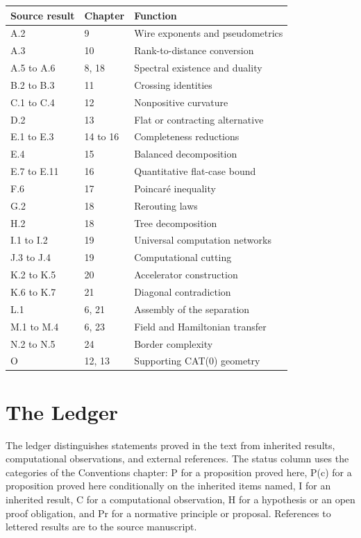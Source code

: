 \documentclass[11pt,letterpaper]{report}
\theoremstyle{plain}
\theoremstyle{definition}
\theoremstyle{remark}
\begin{document}
\begin{longtable}{p{}p{}p{}}
\hline
Source result & Chapter & Function\\
\hline
\endhead
A.2 & 9 & Wire exponents and pseudometrics\\
A.3 & 10 & Rank-to-distance conversion\\
A.5 to A.6 & 8, 18 & Spectral existence and duality\\
B.2 to B.3 & 11 & Crossing identities\\
C.1 to C.4 & 12 & Nonpositive curvature\\
D.2 & 13 & Flat or contracting alternative\\
E.1 to E.3 & 14 to 16 & Completeness reductions\\
E.4 & 15 & Balanced decomposition\\
E.7 to E.11 & 16 & Quantitative flat-case bound\\
F.6 & 17 & Poincar\'e inequality\\
G.2 & 18 & Rerouting laws\\
H.2 & 18 & Tree decomposition\\
I.1 to I.2 & 19 & Universal computation networks\\
J.3 to J.4 & 19 & Computational cutting\\
K.2 to K.5 & 20 & Accelerator construction\\
K.6 to K.7 & 21 & Diagonal contradiction\\
L.1 & 6, 21 & Assembly of the separation\\
M.1 to M.4 & 6, 23 & Field and Hamiltonian transfer\\
N.2 to N.5 & 24 & Border complexity\\
O & 12, 13 & Supporting CAT(0) geometry\\
\hline
\end{longtable}

\section{The Ledger}

The ledger distinguishes statements proved in the text from inherited results, computational observations, and external references. The status column uses the categories of the Conventions chapter: P for a proposition proved here, P(c) for a proposition proved here conditionally on the inherited items named, I for an inherited result, C for a computational observation, H for a hypothesis or an open proof obligation, and Pr for a normative principle or proposal. References to lettered results are to the source manuscript.
\end{document}
